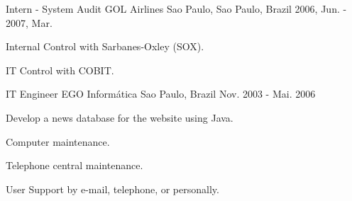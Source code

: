\begin{cventries}
  \cventry
    {Intern - System Audit} %
    {GOL Airlines} %
    {Sao Paulo, Sao Paulo, Brazil} %
    {2006, Jun. - 2007, Mar.} %
    {
          \begin{cvitems} %
            \item {Internal Control with Sarbanes-Oxley (SOX).}
            \item {IT Control with COBIT.}
          \end{cvitems}
    }

  \cventry
    {IT Engineer} %
    {EGO Informática} %
    {Sao Paulo, Brazil} %
    {Nov. 2003 - Mai. 2006} %
    {
          \begin{cvitems} %
            \item {Develop a news database for the website using Java.}
            \item {Computer maintenance.}
            \item {Telephone central maintenance.}
            \item {User Support by e-mail, telephone, or personally.}
          \end{cvitems}
    }

\end{cventries}
